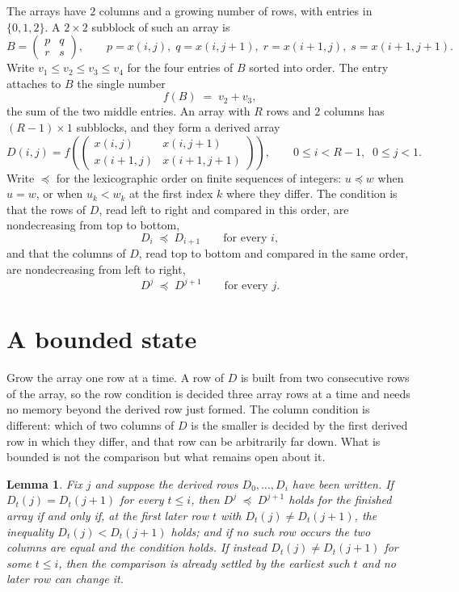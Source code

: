 \documentclass[11pt,a4paper]{article}
\theoremstyle{plain}
\newtheorem{lemma}[theorem]{Lemma}
\theoremstyle{definition}
\begin{document}
The arrays have $2$ columns and a growing number of rows, with entries in $\{0,1,2\}$. A
$2\times2$ subblock of such an array is
\[
B=\begin{pmatrix} p & q \\ r & s \end{pmatrix},
\qquad p=x(i,j),\; q=x(i,j+1),\; r=x(i+1,j),\; s=x(i+1,j+1).
\]
Write $v_1\le v_2\le v_3\le v_4$ for the four entries of $B$ sorted into order. The entry attaches to $B$ the single number
\[
f(B)\;=\;v_2+v_3,
\]
the sum of the two middle entries. An array with $R$ rows and $2$ columns has $(R-1)\times1$ subblocks, and they
form a derived array
\[
D(i,j)=f\!\left(\begin{pmatrix} x(i,j) & x(i,j+1) \\ x(i+1,j) & x(i+1,j+1)\end{pmatrix}
\right),\qquad 0\le i<R-1,\;\; 0\le j<1 .
\]
Write $\preceq$ for the lexicographic order on finite sequences of integers: $u\preceq w$ when
$u=w$, or when $u_k<w_k$ at the first index $k$ where they differ. The condition is that the
rows of $D$, read left to right and compared in this order, are nondecreasing from top to bottom,
\[
D_{i}\;\preceq\;D_{i+1}\qquad\text{for every } i,
\]
and that the columns of $D$, read top to bottom and compared in the same order, are nondecreasing
from left to right,
\[
D^{j}\;\preceq\;D^{j+1}\qquad\text{for every } j .
\]

\section{A bounded state}

Grow the array one row at a time. A row of $D$ is built from two consecutive rows of the array,
so the row condition is decided three array rows at a time and needs no memory beyond the
derived row just formed. The column condition is different: which of two columns of $D$ is the
smaller is decided by the first derived row in which they differ, and that row can be
arbitrarily far down. What is bounded is not the comparison but what remains open about it.

\begin{lemma}\label{lem:bits}
Fix $j$ and suppose the derived rows $D_0,\dots,D_i$ have been written. If $D_t(j)=D_t(j+1)$ for
every $t\le i$, then $D^{j}\;\preceq\;D^{j+1}$ holds for the finished array if and only if,
at the first later row $t$ with $D_t(j)\neq D_t(j+1)$, the inequality $D_t(j)<D_t(j+1)$
holds; and if no such row occurs the two columns are equal and the condition holds. If instead
$D_t(j)\neq D_t(j+1)$ for some $t\le i$, then the comparison is already settled by the earliest
such $t$ and no later row can change it.
\end{lemma}
\end{document}
